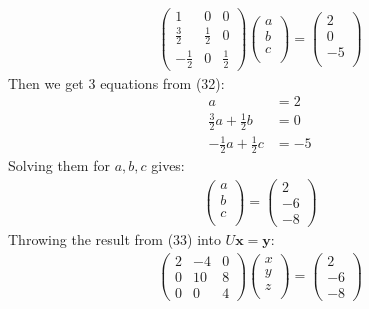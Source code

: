 \documentclass[11pt]{article}
\begin{document}
\begin{align}
\left(\begin{array}{ccc}
1 & 0 & 0 \\
\frac{3}{2} & \frac{1}{2} & 0 \\
-\frac{1}{2} & 0 & \frac{1}{2}
\end{array}\right) 
\left(\begin{array}{c}
a\\
b\\
c\\
\end{array}\right)
=
\left(\begin{array}{c}
2\\
0\\
-5\\
\end{array}\right)
\end{align}
Then we get 3 equations from (32):
\begin{align*}
a&=2\\
\frac{3}{2}a+\frac{1}{2}b&=0\\
-\frac{1}{2}a+\frac{1}{2}c&=-5
\end{align*}
Solving them for $a,b,c$ gives:
\begin{align}
\left(\begin{array}{c}
a\\
b\\
c\\
\end{array}\right)
=
\left(\begin{array}{c}
2\\
-6\\
-8
\end{array}\right)
\end{align}
Throwing the result from (33) into $U\textbf{x}=\textbf{y}$:
\begin{align}
\left(\begin{array}{ccc}
2 & -4 & 0 \\
0 & 10 & 8 \\
0 & 0 & 4
\end{array}\right)
\left(\begin{array}{c}
x\\
y\\
z\\
\end{array}\right)
=
\left(\begin{array}{c}
2\\
-6\\
-8
\end{array}\right)
\end{align}
\end{document}
